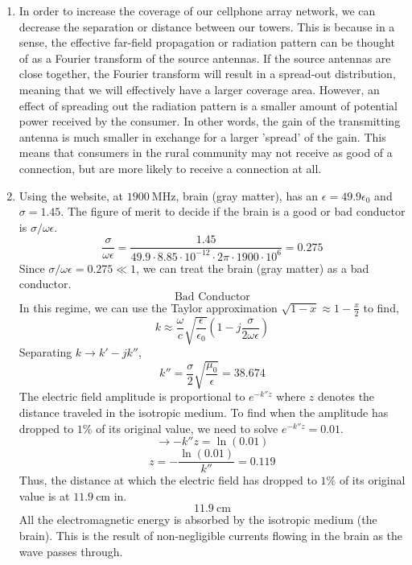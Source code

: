 \documentclass[12pt]{article}
\begin{document}
\begin{enumerate}
\begin{enumerate}
		\item [(b)]
		In order to increase the coverage of our cellphone array network, we can decrease the separation or distance between our towers.
		This is because in a sense, the effective far-field propagation or radiation pattern can be thought of as a Fourier transform of the source antennas.
		If the source antennas are close together, the Fourier transform will result in a spread-out distribution, meaning that we will effectively have a larger coverage area.
		However, an effect of spreading out the radiation pattern is a smaller amount of potential power received by the consumer.
		In other words, the gain of the transmitting antenna is much smaller in exchange for a larger 'spread' of the gain.
		This means that consumers in the rural community may not receive as good of a connection, but are more likely to receive a connection at all.

		\item [(c)]
		Using the website, at $1900 \: \mathrm{MHz}$, brain (gray matter), has an $\epsilon=49.9\epsilon_0$ and $\sigma=1.45$.
		The figure of merit to decide if the brain is a good or bad conductor is $\sigma/\omega \epsilon$.
		\[\frac{\sigma}{\omega \epsilon}=\frac{1.45}{49.9\cdot 8.85 \cdot 10^{-12}\cdot 2\pi \cdot 1900\cdot 10^6}=0.275\]
		Since $\sigma/\omega\epsilon=0.275 \ll 1$, we can treat the brain (gray matter) as a bad conductor.
		\[\boxed{\text{Bad Conductor}}\]
		In this regime, we can use the Taylor approximation $\sqrt{1-x}\approx 1-\frac{x}{2}$ to find,
		\[k\approx \frac{\omega}{c}\sqrt{\frac{\epsilon}{\epsilon_0}}\left(1-j\frac{\sigma}{2\omega \epsilon}\right)\]
		Separating $k\to k'-jk''$,
		\[k'' = \frac{\sigma}{2}\sqrt{\frac{\mu_0}{\epsilon}}=38.674\]
		The electric field amplitude is proportional to $e^{-k''z}$ where $z$ denotes the distance traveled in the isotropic medium.
		To find when the amplitude has dropped to $1\%$ of its original value, we need to solve $e^{-k''z}=0.01$.
		\[\to -k''z=\ln(0.01)\]
		\[z = -\frac{\ln(0.01)}{k''}=0.119\]
		Thus, the distance at which the electric field has dropped to $1\%$ of its original value is at $11.9\:\mathrm{cm}$ in.
		\[\boxed{11.9 \: \mathrm{cm}}\]
		All the electromagnetic energy is absorbed by the isotropic medium (the brain).
		This is the result of non-negligible currents flowing in the brain as the wave passes through.


\end{enumerate}
\end{enumerate}
\end{document}
